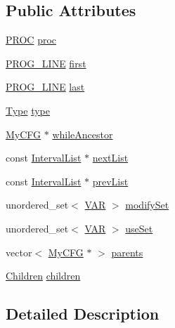 \subsection*{Public Attributes}
\begin{DoxyCompactItemize}
\item 
\hyperlink{std_afx_8h_aa07ea1d188c7b45668f1bd82ffd6d87e}{P\-R\-O\-C} \hyperlink{class_my_c_f_g_a4c0a0b3dfef0a445bd0b888a91996e24}{proc}
\item 
\hyperlink{std_afx_8h_abcc2d0120d16c2587a85b314010f6399}{P\-R\-O\-G\-\_\-\-L\-I\-N\-E} \hyperlink{class_my_c_f_g_a53e3b2c1156fd2e1de1a824ce29c9aad}{first}
\item 
\hyperlink{std_afx_8h_abcc2d0120d16c2587a85b314010f6399}{P\-R\-O\-G\-\_\-\-L\-I\-N\-E} \hyperlink{class_my_c_f_g_a8e650359861450173aa5b3c80485b3f8}{last}
\item 
\hyperlink{class_my_c_f_g_ae44c85f707369fa29092e3c696522f20}{Type} \hyperlink{class_my_c_f_g_ab85a034b6a5e716bd741bbed12bbce24}{type}
\item 
\hyperlink{class_my_c_f_g}{My\-C\-F\-G} $\ast$ \hyperlink{class_my_c_f_g_ac3b206e2ce40df67fd33f4fea05dc6d8}{while\-Ancestor}
\item 
const \hyperlink{class_interval_list}{Interval\-List} $\ast$ \hyperlink{class_my_c_f_g_a00af5ab7f113380ef1ddaca24e204086}{next\-List}
\item 
const \hyperlink{class_interval_list}{Interval\-List} $\ast$ \hyperlink{class_my_c_f_g_ad756fcb5363267f777c1067942d14979}{prev\-List}
\item 
unordered\-\_\-set$<$ \hyperlink{std_afx_8h_a3112e3faf0465bb5d85272a347b7f2f1}{V\-A\-R} $>$ \hyperlink{class_my_c_f_g_ab9f418af86a1491ca74a50135211b47d}{modify\-Set}
\item 
unordered\-\_\-set$<$ \hyperlink{std_afx_8h_a3112e3faf0465bb5d85272a347b7f2f1}{V\-A\-R} $>$ \hyperlink{class_my_c_f_g_a495c1e8a832860ee5bd2cb10ed9042e7}{use\-Set}
\item 
vector$<$ \hyperlink{class_my_c_f_g}{My\-C\-F\-G} $\ast$ $>$ \hyperlink{class_my_c_f_g_a0c76c679c9387cd2e41ad266459d92e5}{parents}
\item 
\hyperlink{union_my_c_f_g_1_1_children}{Children} \hyperlink{class_my_c_f_g_a1475e50cc4408128ba265d45092eec23}{children}
\end{DoxyCompactItemize}


\subsection{Detailed Description}


